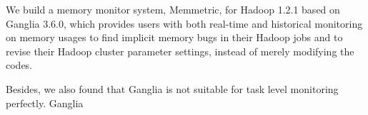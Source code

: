 We build a memory monitor system, Memmetric, for Hadoop 1.2.1 based on Ganglia 3.6.0, which provides users with both real-time and historical monitoring on memory usages to find implicit memory bugs in their Hadoop jobs and to revise their Hadoop cluster parameter settings, instead of merely modifying the codes.

Besides, we also found that Ganglia is not suitable for task level monitoring perfectly. Ganglia 